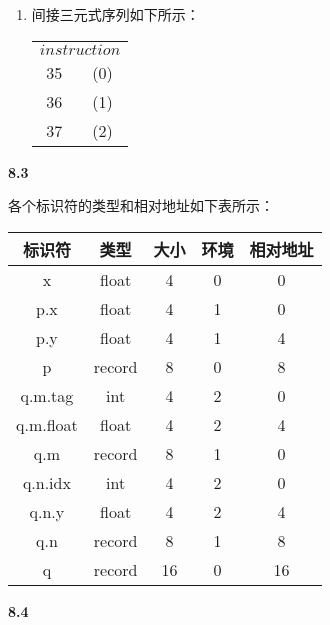 \documentclass[UTF8]{report}
\newcommand{\tbf}[1]{\textbf{#1}}
\begin{document}
\begin{enumerate}
    \item 间接三元式序列如下所示：
    
    \begin{center}
        \begin{tabular}{c|c|}
            \multicolumn{2}{c}{$instruction$} \\
            \cline{2-2}
            35 & (0) \\
            \cline{2-2}
            36 & (1) \\
            \cline{2-2}
            37 & (2) \\
            \cline{2-2}
        \end{tabular}
    \end{center}
\end{enumerate}

\noindent
\tbf{8.3}

各个标识符的类型和相对地址如下表所示：

\begin{center}
    \begin{tabular}{|c|c|c|c|c|}
        \hline
        标识符 & 类型 & 大小 & 环境 & 相对地址 \\
        \hline
        x & float & 4 & 0 & 0 \\
        \hline
        p.x & float & 4 & 1 & 0 \\
        \hline
        p.y & float & 4 & 1 & 4 \\
        \hline
        p & record & 8 & 0 & 8 \\
        \hline
        q.m.tag & int & 4 & 2 & 0 \\
        \hline
        q.m.float & float & 4 & 2 & 4 \\
        \hline
        q.m & record & 8 & 1 & 0 \\
        \hline
        q.n.idx & int & 4 & 2 & 0 \\
        \hline
        q.n.y & float & 4 & 2 & 4 \\
        \hline
        q.n & record & 8 & 1 & 8 \\
        \hline
        q & record & 16 & 0 & 16 \\
        \hline
    \end{tabular}
\end{center}

\noindent
\tbf{8.4}
\end{document}
